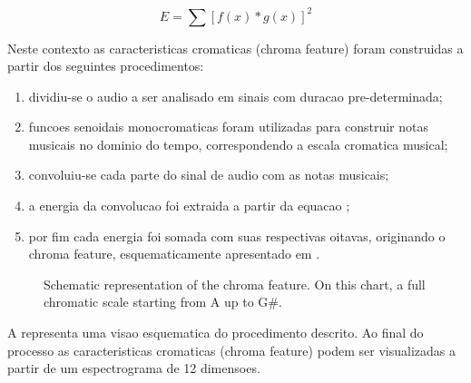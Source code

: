 \documentclass{article}
\begin{document}
	\begin{equation}\label{ccm_equation}
		E = \sum [f(x)*g(x)]^{2}
	\end{equation}

	Neste contexto as caracteristicas cromaticas (chroma feature) foram construidas a partir dos seguintes procedimentos:
	\begin{enumerate}
		\item dividiu-se o audio a ser analisado em sinais com duracao pre-determinada;
		\item funcoes senoidais monocromaticas foram utilizadas para construir notas musicais no dominio do tempo, correspondendo a escala cromatica musical; 
		\item convoluiu-se cada parte do sinal de audio com as notas musicais;
		\item a energia da convolucao foi extraida a partir da equacao ;
		\item por fim cada energia foi somada com suas respectivas oitavas, originando o chroma feature, esquematicamente apresentado em .
	\end{enumerate}

	\newpage
	\begin{figure}[h]
		 \centerline{}
		 \caption{Schematic representation of the chroma feature. On this chart, a full chromatic scale starting from A up to G\#.}
		 \label{fig:chroma_feature}
		\end{figure}

	A  representa uma visao esquematica do procedimento descrito. Ao final do processo as caracteristicas cromaticas (chroma feature) podem ser visualizadas a partir de um espectrograma de 12 dimensoes.
\end{document}
